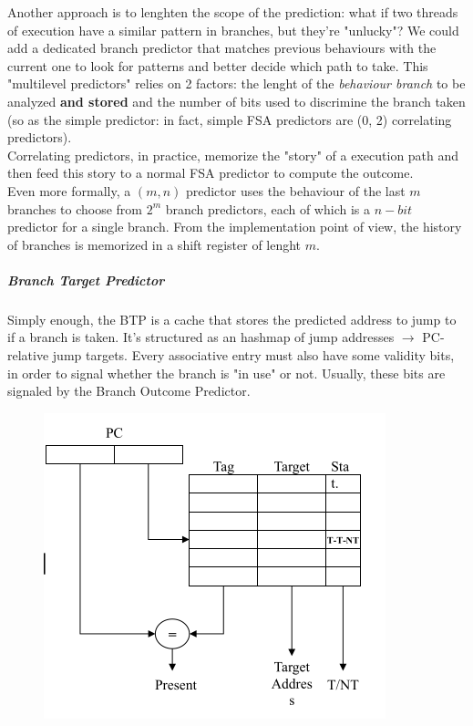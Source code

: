 \documentclass[10pt,a4paper]{article}
\begin{document}
							Another approach is to lenghten the scope of the prediction: what if two threads of execution have a similar pattern in branches, but they're "unlucky"? We could add a dedicated branch predictor that matches previous behaviours with the current one to look for patterns and better decide which path to take. This "multilevel predictors" relies on 2 factors: the lenght of the \emph{behaviour branch} to be analyzed \textbf{and stored} and the number of bits used to discrimine the branch taken (so as the simple predictor: in fact, simple FSA predictors are (0, 2) correlating predictors).\\
							Correlating predictors, in practice, memorize the "story" of a execution path and then feed this story to a normal FSA predictor to compute the outcome.\\
							Even more formally, a $(m, n)$ predictor uses the behaviour of the last $m$ branches to choose from $2^m$ branch predictors, each of which is a $n-bit$ predictor for a single branch. From the implementation point of view, the history of branches is memorized in a shift register of lenght $m$. 
						
						\subparagraph{Branch Target Predictor}
							Simply enough, the BTP is a cache that stores the predicted address to jump to if a branch is taken. It's structured as an hashmap of jump addresses $\rightarrow$ PC-relative jump targets. Every associative entry must also have some validity bits, in order to signal whether the branch is "in use" or not. Usually, these bits are signaled by the Branch Outcome Predictor.
							\begin{figure}[H]
								\centering
								\includegraphics[width = \textwidth]{./images/BTP.png}
							\end{figure}
							
\end{document}
